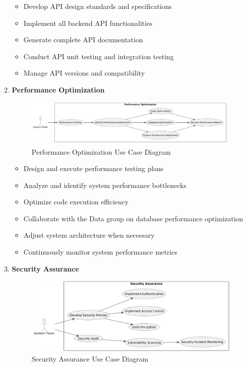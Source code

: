 \documentclass[a4paper,12pt]{article}
\begin{document}
\begin{enumerate}
  \begin{itemize}
    \item Develop API design standards and specifications
    \item Implement all backend API functionalities
    \item Generate complete API documentation
    \item Conduct API unit testing and integration testing
    \item Manage API versions and compatibility
  \end{itemize}
  
  \item \textbf{Performance Optimization}
  
  \begin{figure}[H]
    \centering
    \includegraphics[width=0.75\linewidth]{assets/image5_EG.png}
    \caption{Performance Optimization Use Case Diagram}
    \label{fig:performance-optimization}
  \end{figure}
  
  \begin{itemize}
    \item Design and execute performance testing plans
    \item Analyze and identify system performance bottlenecks
    \item Optimize code execution efficiency
    \item Collaborate with the Data group on database performance optimization
    \item Adjust system architecture when necessary
    \item Continuously monitor system performance metrics
  \end{itemize}
  
  \item \textbf{Security Assurance}
  
  \begin{figure}[H]
    \centering
    \includegraphics[width=0.75\linewidth]{assets/image6_EG.png}
    \caption{Security Assurance Use Case Diagram}
    \label{fig:security-protection}
  \end{figure}
  

\end{enumerate}
\end{document}

